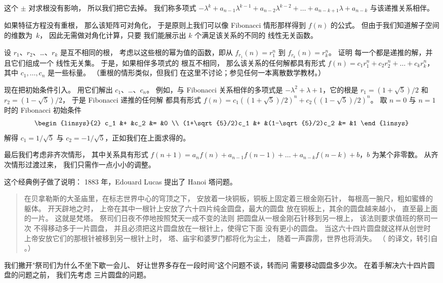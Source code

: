 这个 $\pm$ 对求根没有影响，
所以我们把它去掉。
我们称多项式
$-\lambda^k+a_{n-1}\lambda^{k-1}+a_{n-2}\lambda^{k-2}
       +\dots+a_{n-k+1}\lambda+a_{n-k}$
与该递推关系相伴。

如果特征方程没有重根，
那么该矩阵可对角化，
于是原则上我们可以像 Fibonacci 情形那样得到 $f(n)$ 的公式。
但由于我们知道解子空间的维数为~$k$，
因此无需做对角化计算，只要
我们能展示出 $k$ 个满足该关系的不同的
线性无关函数。

设 $r_1$、$r_2$、\ldots、$r_k$ 是互不相同的根，
考虑以这些根的幂为值的函数，即从 $f_{r_1}(n)=r_1^n$ 到
$f_{r_k}(n)=r_k^n$。
 证明
每一个都是递推的解，并且它们组成一个
线性无关集。
于是，如果相伴多项式的
根互不相同，
那么该关系的任何解都具有形式
$f(n)=c_1r_1^n+c_2r_2^n+\dots+c_kr_k^n$，其中 $c_1, \dots, c_n$ 是一些标量。
（重根的情形类似，但我们
在这里不讨论；参见任何一本离散数学教材。）

现在把初始条件引入。
用它们解出 $c_1$、\ldots、$c_n$。
例如，与 Fibonacci 关系相伴的多项式是
$-\lambda^2+\lambda+1$，它的根是 $r_1=(1+\sqrt{5})/2$
和 $r_2=(1-\sqrt{5})/2$，
于是 Fibonacci 递推的任何解
都具有形式 $f(n)=c_1((1+\sqrt{5})/2)^n+c_2((1-\sqrt{5})/2)^n$。
取 $n=0$ 与 $n=1$ 时的 Fibonacci 初始条件
\begin{equation*}
  \begin{linsys}{2}
    c_1               &+  &c_2               &=  &0  \\
    (1+\sqrt{5}/2)c_1 &+  &(1-\sqrt{5}/2)c_2 &=  &1
  \end{linsys}
\end{equation*}
解得 $c_1=1/\sqrt{5}$ 与 $c_2=-1/\sqrt{5}$，正如我们在上面求得的。

最后我们考虑非齐次情形，
其中关系具有形式
$f(n+1)=a_nf(n)+a_{n-1}f(n-1)+\dots+a_{n-k}f(n-k)+b$，$b$ 为某个非零数。
从齐次情形过渡过来，
我们只需作一点小小的调整。

这个经典例子做了说明：
1883 年，Edouard Lucas 提出了
Hanoi 塔问题。
\begin{quotation}
  \noindent
  在贝拿勒斯的大圣庙里，在标志世界中心的穹顶之下，
  安放着一块铜板，铜板上固定着三根金刚石针，
  每根高一腕尺，粗如蜜蜂的躯体。
  开天辟地之时，
  上帝在其中一根针上安放了六十四片纯金圆盘，最大的圆盘
  放在铜板上，其余的圆盘越来越小，
  直至最上面的一片。
  这就是梵塔。
  祭司们日夜不停地按照梵天一成不变的法则
  把圆盘从一根金刚石针移到另一根上，
  该法则要求值班的祭司一次
  不得移动多于一片圆盘，
  并且必须把这片圆盘放在一根针上，使得它下面
  没有更小的圆盘。
  当这六十四片圆盘就这样从创世时
  上帝安放它们的那根针被移到另一根针上时，
  塔、庙宇和婆罗门都将化为尘土，
  随着一声霹雳，世界也将消失。
  （\cite{DeParville} 的译文，转引自 \cite{Ball}。）
\end{quotation}
我们撇开"祭司们为什么不坐下歇一会儿、
好让世界多存在一段时间"这个问题不谈，转而问
需要移动圆盘多少次。
在着手解决六十四片圆盘的问题之前，
我们先考虑
三片圆盘的问题。


